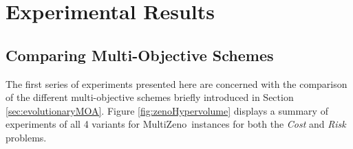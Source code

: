 \documentclass{llncs}
\def\DAE{{\sc DaE}}
\def\MULTIZENO{{\sc MultiZeno}}
\def\PARAMILS{{\sc ParamILS}}
\begin{document}


\section{Experimental Results}
\label{sec:experiments}

\subsection{Comparing Multi-Objective Schemes}
The first series of experiments presented here are concerned with the comparison of the different multi-objective schemes briefly introduced in Section \ref{sec:evolutionaryMOA}.
Figure \ref{fig:zenoHypervolume} displays a summary of experiments of all 4 variants for \MULTIZENO\ instances for both the {\em Cost} and {\em Risk} problems.  
\end{document}
